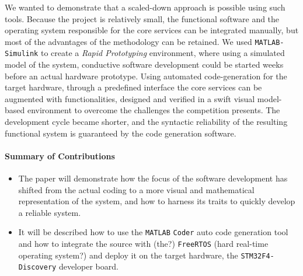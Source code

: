 
We wanted to demonstrate that a scaled-down approach is possible using such tools. Because the project is relatively small, the functional software and the operating system responsible for the core services can be integrated manually, but most of the advantages of the methodology can be retained. We used \verb!MATLAB-Simulink! to create a \emph{Rapid Prototyping} environment, where using a simulated model of the system, conductive software development could be started weeks before an actual hardware prototype. Using automated code-generation for the target hardware, through a predefined interface the core services can be augmented with functionalities, designed and verified in a swift visual model-based environment to overcome the challenges the competition presents. The development cycle became shorter, and the syntactic reliability of the resulting functional system is guaranteed by the code generation software.

\paragraph{Summary of Contributions}
\begin{itemize}
\item The paper will demonstrate how the focus of the software development has shifted from the actual coding to a more visual and mathematical representation of the system, and how to harness its traits to quickly develop a reliable system.
\item It will be described how to use the \verb!MATLAB! \verb!Coder! auto code generation tool and how to integrate the source with (the?) \verb!FreeRTOS! (hard real-time operating system?) and deploy it on the target hardware, the \verb!STM32F4-Discovery! developer board.
\end{itemize}